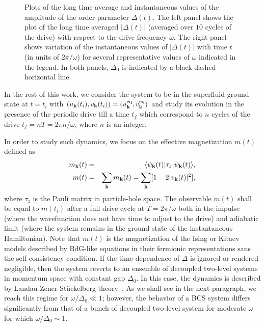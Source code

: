 \documentclass[a4paper,10pt]{report}
\begin{document}
\begin{figure}
\begin{center}
\end{center}
\caption{  Plots of the long time average and
instantaneous values of the amplitude of the order parameter
$\Delta(t)$. The left panel shows the plot of the long time averaged
$|\Delta(t)|$ (averaged over $10$ cycles of the drive) with respect
to the drive frequency $\omega$. The right panel shows variation of
the instantaneous values of $|\Delta(t)|$ with time $t$ (in units of
$2\pi/\omega$) for several representative values of $\omega$
indicated in the legend. In both panels, $\Delta_0$ is indicated by
a black dashed horizontal line.} \label{fig4}
\end{figure}
In the rest of this work, we consider the system to be in the
superfluid ground state at $t=t_i$ with $(u_{\bf k}(t_i), v_{\bf
k}(t_i)) =(u^{\rm eq}_{\bf k}, v_{\bf k}^{\rm eq})$ and study its
evolution in the presence of the periodic drive till a time $t_f$
which correspond to $n$ cycles of the drive $t_f =nT=2\pi n/\omega$,
where $n$ is an integer.

In order to study such dynamics, we focus on the effective magnetization $m(t)$
defined as
\begin{eqnarray}
m_{\bf k}(t) &=& \langle \psi_{\bf k}(t)| \tau_z |\psi_{\bf k}(t)\rangle, \nonumber \\
m(t) &=& \sum_{\bf k} m_{\bf k}(t) = \sum_{\bf k} [1-2|v_{\bf
k}(t)|^2 ],\label{eq:mag}
\end{eqnarray}
where $\tau_z$ is the Pauli matrix in particle-hole space. The
observable $m(t)$ shall be equal to $m(t_i)$ after a full drive
cycle at $T=2\pi/\omega$ both in the impulse (where the wavefunction
does not have time to adjust to the drive) and adiabatic limit
(where the system remains in the ground state of the instantaneous
Hamiltonian). Note that $m(t)$ is the magnetization of the Ising or
Kitaev models described by BdG-like equations in their fermionic
representations sans the self-consistency
condition\cite{arnab1,diptiman}. If the time dependence of $\Delta$ is ignored or rendered
negligible, then the system reverts to an ensemble of decoupled
two-level systems in momentum space with constant gap $\Delta_0$. In
this case, the dynamics is described by Landau-Zener-St\"uckelberg
theory~\cite{review:lzstls}. As we shall see in the next paragraph, we
reach this regime for $ \omega/\Delta_0 \ll 1$; however, the
behavior of a BCS system differs significantly from that of a bunch
of decoupled two-level system for moderate $\omega$ for which
$\omega/\Delta_0 \sim 1$.
\end{document}
